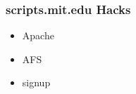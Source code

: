 \begin{frame}
  \frametitle{scripts.mit.edu Hacks}
  \begin{itemize}
      \item Apache
      \item AFS
      \item signup
  \end{itemize}
\end{frame}

